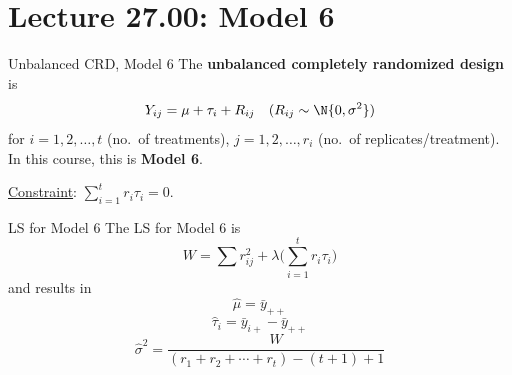 \documentclass[oneside]{book}\usepackage[]{graphicx}\usepackage[dvipsnames,table,xcdraw]{xcolor}
\begin{document}
\section{Lecture 27.00: Model 6}
\begin{Definition}{Unbalanced CRD, Model 6}{}
    The \textbf{unbalanced completely randomized design} is
    \[ Y_{ij}=\mu+\tau_i+R_{ij}\quad(R_{ij}\sim \N{0,\sigma^2}) \]
    for $ i=1,2,\ldots,t $ (no.\ of treatments),
    $ j=1,2,\ldots,r_i $ (no.\ of replicates/treatment).
    In this course, this is \textbf{Model 6}.

    \underline{Constraint}: $ \sum_{i=1}^{t} r_i \tau_i=0 $.
\end{Definition}
\begin{Example}{LS for Model 6}{}
    The LS for Model 6 is
    \[ W=\sum r_{ij}^2 +\lambda\biggl(\sum_{i=1}^{t} r_i\tau_i\biggr)  \]
    and results in
    \[ \hat{\mu}=\bar{y}_{++} \]
    \[ \hat{\tau}_i=\bar{y}_{i+}-\bar{y}_{++} \]
    \[ \hat{\sigma}^2=\frac{W}{(r_1+r_2+\cdots+r_t)-(t+1)+1}  \]
\end{Example}
\end{document}
